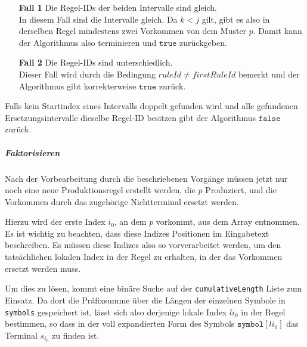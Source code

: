 \begin{enumerate}
	\item[\textbf{Fall 1}] Die Regel-IDs der beiden Intervalle sind gleich.\\
	In diesem Fall sind die Intervalle gleich. Da $k < j$ gilt, gibt es also in derselben Regel mindestens zwei Vorkommen von dem Muster $p$. Damit kann der Algorithmus also terminieren und $\texttt{true}$ zurückgeben.
	\item[\textbf{Fall 2}] Die Regel-IDs sind unterschiedlich.\\
	Dieser Fall wird durch die Bedingung $ruleId \neq firstRuleId$ bemerkt und der Algorithmus gibt korrekterweise $\texttt{true}$ zurück.
\end{enumerate}

Falls kein Startindex eines Intervalls doppelt gefunden wird und alle gefundenen Ersetzungsintervalle dieselbe Regel-ID besitzen gibt der Algorithmus $\texttt{false}$ zurück.

\subparagraph{Faktorisieren}

Nach der Vorbearbeitung durch die beschriebenen Vorgänge müssen jetzt nur noch eine neue Produktionsregel erstellt werden, die $p$ Produziert, und die Vorkommen durch das zugehörige Nichtterminal ersetzt werden.

Hierzu wird der erste Index $i_0$, an dem $p$ vorkommt, aus dem Array entnommen.  Es ist wichtig zu beachten, dass diese Indizes Positionen im Eingabetext beschreiben. Es müssen diese Indizes also so vorverarbeitet werden, um den tatsächlichen lokalen Index in der Regel zu erhalten, in der das Vorkommen ersetzt werden muss.

Um dies zu lösen, kommt eine binäre Suche auf der \texttt{cumulativeLength} Liste zum Einsatz. Da dort die Präfixsumme über die Längen der einzelnen Symbole in \texttt{symbols} gespeichert ist, lässt sich also derjenige lokale Index $li_0$ in der Regel bestimmen, so dass in der voll expandierten Form des Symbols $\texttt{symbol}[li_0]$ das Terminal $s_{i_0}$ zu finden ist.



